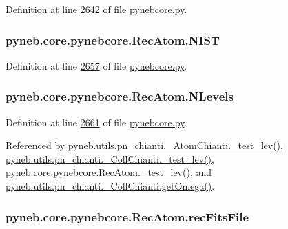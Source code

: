 Definition at line \hyperlink{pynebcore_8py_source_l02642}{2642} of file \hyperlink{pynebcore_8py_source}{pynebcore.\-py}.

\hypertarget{classpyneb_1_1core_1_1pynebcore_1_1_rec_atom_afe5a91d97ffefced34fb2f2c271736ec}{
\subsubsection[{N\-I\-S\-T}]{\setlength{\rightskip}{0pt plus 5cm}pyneb.\-core.\-pynebcore.\-Rec\-Atom.\-N\-I\-S\-T}}\label{classpyneb_1_1core_1_1pynebcore_1_1_rec_atom_afe5a91d97ffefced34fb2f2c271736ec}


Definition at line \hyperlink{pynebcore_8py_source_l02657}{2657} of file \hyperlink{pynebcore_8py_source}{pynebcore.\-py}.

\hypertarget{classpyneb_1_1core_1_1pynebcore_1_1_rec_atom_a37c93c0fbaad583a1019f5930bc51999}{
\subsubsection[{N\-Levels}]{\setlength{\rightskip}{0pt plus 5cm}pyneb.\-core.\-pynebcore.\-Rec\-Atom.\-N\-Levels}}\label{classpyneb_1_1core_1_1pynebcore_1_1_rec_atom_a37c93c0fbaad583a1019f5930bc51999}


Definition at line \hyperlink{pynebcore_8py_source_l02661}{2661} of file \hyperlink{pynebcore_8py_source}{pynebcore.\-py}.



Referenced by \hyperlink{pn__chianti_8py_source_l00304}{pyneb.\-utils.\-pn\-\_\-chianti.\-\_\-\-Atom\-Chianti.\-\_\-test\-\_\-lev()}, \hyperlink{pn__chianti_8py_source_l00472}{pyneb.\-utils.\-pn\-\_\-chianti.\-\_\-\-Coll\-Chianti.\-\_\-test\-\_\-lev()}, \hyperlink{pynebcore_8py_source_l02672}{pyneb.\-core.\-pynebcore.\-Rec\-Atom.\-\_\-test\-\_\-lev()}, and \hyperlink{pn__chianti_8py_source_l00507}{pyneb.\-utils.\-pn\-\_\-chianti.\-\_\-\-Coll\-Chianti.\-get\-Omega()}.

\hypertarget{classpyneb_1_1core_1_1pynebcore_1_1_rec_atom_a2108a27da329b8599357e990a446faae}{
\subsubsection[{rec\-Fits\-File}]{\setlength{\rightskip}{0pt plus 5cm}pyneb.\-core.\-pynebcore.\-Rec\-Atom.\-rec\-Fits\-File}}\label{classpyneb_1_1core_1_1pynebcore_1_1_rec_atom_a2108a27da329b8599357e990a446faae}


